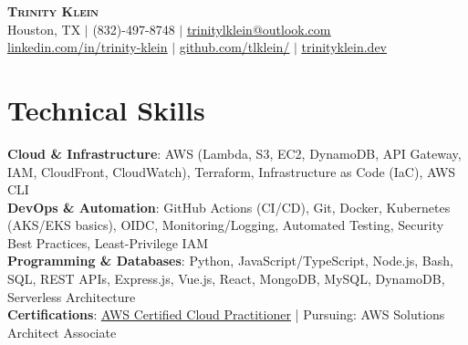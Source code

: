 \documentclass[letterpaper,11pt]{article}
\begin{document}
\begin{center}
    \textbf{\Huge \scshape Trinity Klein} \\ \vspace{1pt}
    \small Houston, TX $|$ \small (832)-497-8748 $|$ \href{mailto:trinitylklein@outlook.com}{\underline{trinitylklein@outlook.com}} \\ 
    \href{https://linkedin.com/in/trinity-klein}{\underline{linkedin.com/in/trinity-klein}} $|$
    \href{https://github.com/tlklein/}{\underline{github.com/tlklein/}} $|$
    \href{https://trinityklein.dev}{\underline{trinityklein.dev}}
\end{center}

\section{Technical Skills}
 \begin{itemize}[leftmargin=0.15in, label={}]
     \small{\item{
     \textbf{Cloud \& Infrastructure}{: AWS (Lambda, S3, EC2, DynamoDB, API Gateway, IAM, CloudFront, CloudWatch), Terraform, Infrastructure as Code (IaC), AWS CLI} \\
     \textbf{DevOps \& Automation}{: GitHub Actions (CI/CD), Git, Docker, Kubernetes (AKS/EKS basics), OIDC, Monitoring/Logging, Automated Testing, Security Best Practices, Least-Privilege IAM} \\
     \textbf{Programming \& Databases}{: Python, JavaScript/TypeScript, Node.js, Bash, SQL, REST APIs, Express.js, Vue.js, React, MongoDB, MySQL, DynamoDB, Serverless Architecture} \\
     \textbf{Certifications}{: \href{https://www.credly.com/badges/9ab1424b-f346-4461-a1b7-829dc8591cd9}{\underline{AWS Certified Cloud Practitioner}} | Pursuing: AWS Solutions Architect Associate}
    }}
 \end{itemize}


\end{document}
